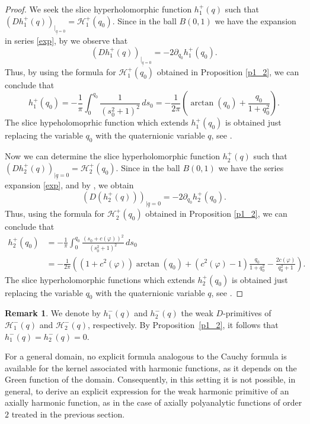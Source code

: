 \documentclass[reqno,11pt]{amsart}
\numberwithin{equation}{section}
\newcommand{\unq}{\underline{q}}
\theoremstyle{definition}
\newtheorem{remark}[theorem]{{\bf Remark}}
\begin{document}
\begin{proof}
	
	We seek the slice hyperholomorphic function $h_1^+(q)$ such that $\left(D h_1^+(q)\right)_{|_{\unq=0}}=\mathcal H^+_1(q_0)$. Since in the ball $B(0,1)$ we have the expansion in series \eqref{exp}, by \cite[Lemma 2.81]{CDS2025} we observe that
	$$ \left(D h_1^+(q)\right)_{|_{\unq=0}}=-2\partial_{q_0}h_1^+ (q_0). $$
	Thus, by using the formula for $\mathcal H^+_1(q_0)$ obtained in Proposition \ref{p1_2}, we can conclude that
	$$ h_1^+(q_0)=- \frac{1}{\pi} \int_{0}^{q_0} \frac{1}{(s_0^2+1)^2}\, ds_0 =-\frac{1}{2\pi}\left( \arctan(q_0)+ \frac{q_0}{1+q_0^2} \right). $$
	The slice hypeholomoprhic function which extends $h_1^+(q_0)$ is obtained just replacing the variable $q_0$ with the quaternionic variable $q$, see \cite{CSSisrael2}.
	
Now we can determine the slice hyperholomorphic function $h_2^+(q)$ such that $\left(Dh_2^+(q)\right)_{\mid \underline{q}=0}=\mathcal{H}_2^+(q_0)$.
Since in the ball $B(0,1)$ we have the series expansion \eqref{exp}, and by \cite[Lemma 2.81]{CDS2025}, we obtain
	$$ \left( D(h_2^+(q)) \right)_{| \unq=0}=-2\partial_{q_0} h_2^+ (q_0). $$
	Thus, using the formula for $\mathcal H^+_2(q_0)$ obtained in Proposition \ref{p1_2}, we can conclude that
	\begin{align*}
		h_2^+(q_0) & =- \frac{1}{\pi} \int_{0}^{q_0} \frac{(s_0+c(\varphi))^2}{(s_0^2+1)^2}\, ds_0\\
		&  =-\frac{1}{2\pi}\left((1+c^2(\varphi)) \arctan(q_0)+ (c^2(\varphi)-1)\frac{q_0}{1+q_0^2} -\frac{2c(\varphi)}{q_0^2+1}\right).
	\end{align*}
	The slice hyperholomorphic functions which extends $h_2^+(q_0)$ is obtained just replacing the variable $q_0$ with the quaternionic variable $q$, see \cite{CSSisrael2}.
\end{proof}

\begin{remark}
\label{prim}
We denote by $h_1^{-}(q)$ and $h_2^{-}(q)$ the weak $D$-primitives of $\mathcal{H}_1^{-}(q)$ and $\mathcal{H}_2^{-}(q)$, respectively. By Proposition~\ref{p1_2}, it follows that $h_1^{-}(q)=h_2^{-}(q)=0$.
\end{remark}

For a general domain, no explicit formula analogous to the Cauchy formula is available for the kernel associated with harmonic functions, as it depends on the Green function of the domain. Consequently, in this setting it is not possible, in general, to derive an explicit expression for the weak harmonic primitive of an axially harmonic function, as in the case of axially polyanalytic functions of order $2$ treated in the previous section.
\end{document}
